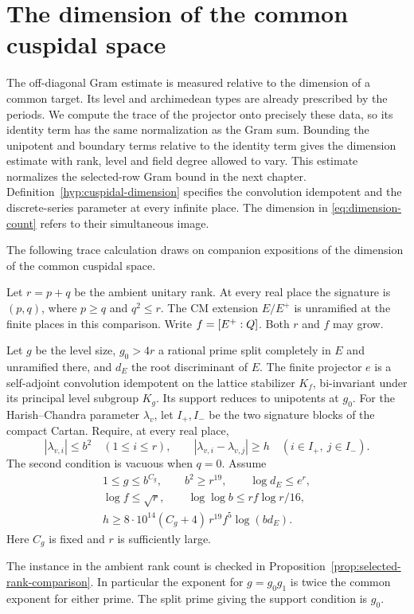 \section{The dimension of the common cuspidal space}\label{sec:count}

The off-diagonal Gram estimate is measured relative to the dimension of a common target. Its level and archimedean types are already prescribed by the periods. We compute the trace of the projector onto precisely these data, so its identity term has the same normalization as the Gram sum. Bounding the unipotent
and boundary terms relative to the identity term gives the
dimension estimate with rank, level and field degree allowed
to vary. This estimate normalizes the selected-row Gram
bound in the next chapter. Definition~\ref{hyp:cuspidal-dimension} specifies the convolution idempotent and the discrete-series parameter at every infinite place. The dimension in \eqref{eq:dimension-count} refers to their simultaneous image.

The following trace calculation draws on companion expositions of
the dimension of the common cuspidal space. \cite{companion-row-count}
\begin{paramdefinition}\label{hyp:cuspidal-dimension}
Let \(r=p+q\) be the ambient unitary rank. At every real place the signature is \((p,q)\), where \(p\ge q\) and \(q^2\le r\). The CM extension
\(E/E^+\) is unramified at the finite places in this comparison.
Write \(f=[E^+:Q]\). Both \(r\) and \(f\) may grow.

Let \(g\) be the level
size, \(g_0>4r\) a rational prime split completely in \(E\)
and unramified there, and \(d_E\) the root discriminant of \(E\).
The finite projector \(e\) is a self-adjoint convolution idempotent
on the lattice stabilizer \(K_f\), bi-invariant under its principal
level subgroup \(K_g\). Its support reduces to unipotents at \(g_0\).
For the Harish--Chandra parameter \(\lambda_v\), let \(I_+, I_-\)
be the two signature blocks of the compact Cartan. Require, at every
real place,
\[
 |\lambda_{v,i}|\le b^2\quad(1\le i\le r),\qquad
 |\lambda_{v,i}-\lambda_{v,j}|\ge h\quad(i\in I_+,\ j\in I_-).
\]
The second condition is vacuous when \(q=0\).
Assume
\[
 \begin{gathered}
 1\le g\le b^{C_g},\qquad b^2\ge r^{19},\qquad
 \log d_E\le e^r,\\
 \log f\le\sqrt r,\qquad \log\log b\le rf\log r/16,\\
 h\ge 8\cdot10^{14}(C_g+4)\,r^{19}f^5\log(bd_E).
 \end{gathered}
\]
Here \(C_g\) is fixed and \(r\) is sufficiently large. \end{paramdefinition}
The instance in the ambient rank count is checked in Proposition~\ref{prop:selected-rank-comparison}. In particular the exponent for \(g=g_0g_1\) is twice the common exponent for either prime. The split prime giving the support condition is \(g_0\).

